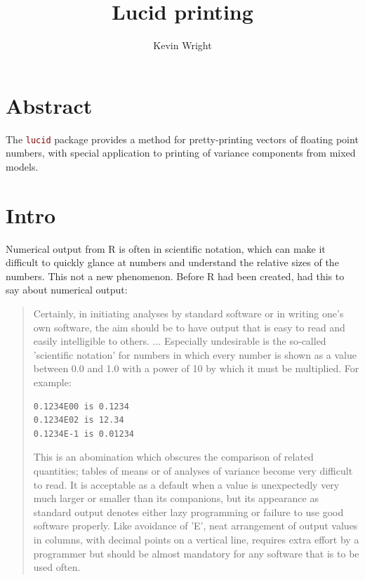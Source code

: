 \documentclass[12pt]{article}\usepackage[]{graphicx}\usepackage[]{color}
\newcommand{\code}[1]{\texttt{\textcolor{maroon}{#1}}}
\begin{document}
\title{Lucid printing}
\author{Kevin Wright}
\maketitle
\thispagestyle{fancy}



\section{Abstract}

The \code{lucid} package provides a method for pretty-printing vectors
of floating point numbers, with special application to
printing of variance components from mixed models.


\section{Intro}

Numerical output from R is often in scientific notation, which can make it
difficult to quickly glance at numbers and understand the relative sizes
of the numbers.  This not a new phenomenon.  Before R had been created,
\cite[351-352]{finney1988data} had this to say about numerical output:
\begin{quote}
Certainly, in initiating analyses by standard software or in writing one's
own software, the aim should be to have output that is easy to read and easily
intelligible to others. ... Especially undesirable is the so-called
'scientific notation' for numbers in which every number is shown as a value
between 0.0 and 1.0 with a power of 10 by which it must be multiplied. For
example:
\begin{verbatim}
0.1234E00 is 0.1234
0.1234E02 is 12.34
0.1234E-1 is 0.01234
\end{verbatim}
This is an abomination which obscures the comparison of related quantities;
tables of means or of analyses of variance become very difficult to read. It
is acceptable as a default when a value is unexpectedly very much larger or
smaller than its companions, but its appearance as standard output denotes
either lazy programming or failure to use good software properly. Like
avoidance of 'E', neat arrangement of output values in columns, with decimal
points on a vertical line, requires extra effort by a programmer but should be
almost mandatory for any software that is to be used often.
\end{quote}
\end{document}
